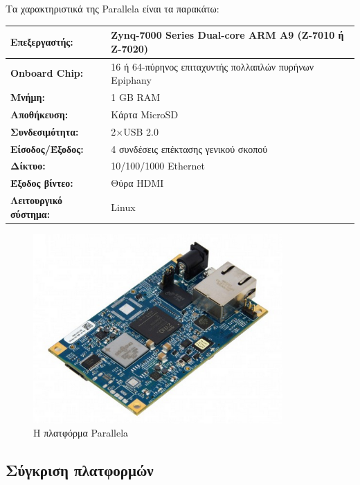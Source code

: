 \documentclass[12pt, a4paper, oneside]{report}
\begin{document}
Τα χαρακτηριστικά της Parallela είναι τα παρακάτω:
\begin{table}[t]
\centering
{\renewcommand{\arraystretch}{1.5}
\renewcommand{\tabcolsep}{0.2cm}
\footnotesize
\begin{tabular}{L{0.3\textwidth} L{0.65\textwidth}}
\hline
\textbf{Επεξεργαστής:} & Zynq-7000 Series Dual-core ARM A9 (Z-7010 ή Z-7020)\\ \hline
\textbf{Onboard Chip:} & 16 ή 64-πύρηνος επιταχυντής πολλαπλών πυρήνων Epiphany\\ \hline
\textbf{Μνήμη:} & 1 GB RAM\\ \hline
\textbf{Αποθήκευση:} & Κάρτα MicroSD\\ \hline
\textbf{Συνδεσιμότητα:} & 2$\times$USB 2.0\\ \hline
\textbf{Είσοδος\slash Έξοδος:} & 4 συνδέσεις επέκτασης γενικού σκοπού\\ \hline
\textbf{Δίκτυο:} & 10\slash 100\slash 1000 Ethernet\\ \hline
\textbf{Έξοδος βίντεο:} & Θύρα HDMI\\ \hline
\textbf{Λειτουργικό σύστημα:} & Linux\\ \hline
\end{tabular}
}
\end{table}

\begin{figure}[!hb]
\centering
\includegraphics[width=0.85\textwidth]{img_parallela}
\caption[Η πλατφόρμα Parallela]{Η πλατφόρμα Parallela\cite{parallela}}
\end{figure}
\clearpage

\subsection{Σύγκριση πλατφορμών}
\end{document}
